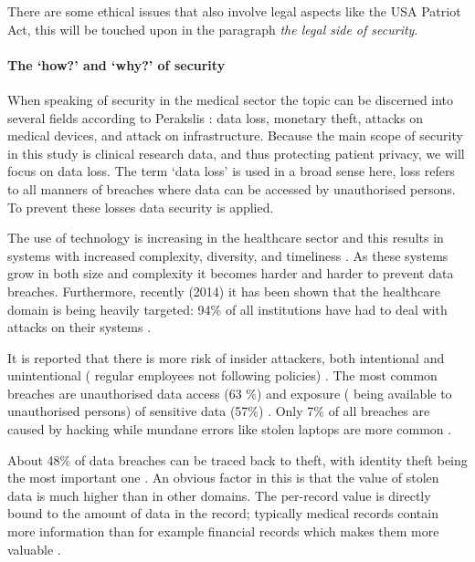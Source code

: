There are some ethical issues that also involve legal aspects like the USA Patriot Act, this will be touched upon in the paragraph \emph{the legal side of security}.

\paragraph{The `how?' and `why?' of security}
\label{security-how-why}

When speaking of security in the medical sector the topic can be discerned into several fields according to Perakslis \cite{s2Perakslis2014}: data loss, monetary theft, attacks on medical devices, and attack on infrastructure.
Because the main scope of security in this study is clinical research data, and thus protecting patient privacy, we will focus on data loss.
The term `data loss' is used in a broad sense here, loss refers to all manners of breaches where data can be accessed by unauthorised persons.
To prevent these losses data security is applied.

The use of technology is increasing in the healthcare sector and this results in systems with increased complexity, diversity, and timeliness \cite{s13Patil2014}.
As these systems grow in both size and complexity it becomes harder and harder to prevent data breaches.
Furthermore, recently (2014) it has been shown that the healthcare domain is being heavily targeted: 94\% of all institutions have had to deal with attacks on their systems \cite{s2Perakslis2014}.

It is reported that there is more risk of insider attackers, both intentional and unintentional (\eg{} regular employees not following policies) \cite{s1Zamosky2014}.
The most common breaches are unauthorised data access (63 \%) and exposure (\ie{} being available to unauthorised persons) of sensitive data (57\%) \cite{s18Kum2014}.
Only 7\% of all breaches are caused by hacking while mundane errors like stolen laptops are more common \cite{s1Zamosky2014}.

About 48\% of data breaches can be traced back to theft, with identity theft being the most important one \cite{s1Zamosky2014}.
An obvious factor in this is that the value of stolen data is much higher than in other domains.
The per-record value is directly bound to the amount of data in the record; typically medical records contain more information than for example financial records which makes them more valuable \cite{s1Zamosky2014}.

